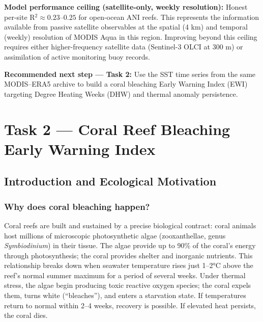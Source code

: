 \documentclass[12pt,a4paper]{report}
\begin{document}
\begin{findingbox}
\vspace{6pt}
\textbf{Model performance ceiling (satellite-only, weekly resolution):}
Honest per-site R$^2 \approx 0.23$--$0.25$ for open-ocean ANI reefs.
This represents the information available from passive satellite observables at
the spatial (4 km) and temporal (weekly) resolution of MODIS Aqua in this region.
Improving beyond this ceiling requires either higher-frequency satellite data
(Sentinel-3 OLCI at 300 m) or assimilation of active monitoring buoy records.

\vspace{6pt}
\textbf{Recommended next step — Task 2:} Use the SST time series from the same
MODIS--ERA5 archive to build a coral bleaching Early Warning Index (EWI) targeting
Degree Heating Weeks (DHW) and thermal anomaly persistence.
\end{findingbox}


\chapter{Task 2 — Coral Reef Bleaching Early Warning Index}
\label{chap:task2}

\section{Introduction and Ecological Motivation}
\label{sec:task2_intro}

\subsection{Why does coral bleaching happen?}

Coral reefs are built and sustained by a precise biological contract: coral animals
host millions of microscopic photosynthetic algae (zooxanthellae, genus
\textit{Symbiodinium}) in their tissue. The algae provide up to 90\% of the coral's
energy through photosynthesis; the coral provides shelter and inorganic nutrients.
This relationship breaks down when seawater temperature rises just 1--2°C above
the reef's normal summer maximum for a period of several weeks. Under thermal stress,
the algae begin producing toxic reactive oxygen species; the coral expels them, turns
white (``bleaches''), and enters a starvation state. If temperatures return to normal
within 2--4 weeks, recovery is possible. If elevated heat persists, the coral dies.
\end{document}
